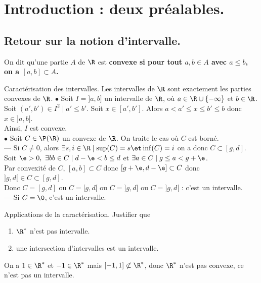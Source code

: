 \documentclass[11pt]{article}
\begin{document}


\thispagestyle{fancy}

\setcounter{section}{-1}

\section{Introduction : deux préalables.}

\subsection{Retour sur la notion d'intervalle.}

\begin{defi}{}{}
    On dit qu'une partie $A$ de $\R$ est \bf{convexe} si pour tout $a,b\in A$ avec $a\leq b$, on a $[a,b]\subset A$.
\end{defi}

\begin{prop}{Caractérisation des intervalles.}{}
    Les intervalles de $\R$ sont exactement les parties convexes de $\R$.
    \tcblower
    $\bullet$ Soit $I=]a,b]$ un intervalle de $\R$, où $a\in\R\cup\{-\infty\}$ et $b\in\R$.\\
    Soit $(a',b')\in I^2 \mid a' \leq b'$. Soit $x\in[a',b']$. Alors $a<a'\leq x \leq b' \leq b$ donc $x\in]a,b]$.\\
    Ainsi, $I$ est convexe.\\
    $\bullet$ Soit $C\in\P(\R)$ un convexe de $\R$. On traite le cas où $C$ est borné.\\
    --- Si $C\neq0$, alors $\exists s,i\in\R \mid \sup(C)=s \et \inf(C)=i$ on a donc $C\subset[g,d]$.\\
    Soit $\e>0, ~ \exists bb \in C \mid d-\e < b \leq d$ et $\exists a \in C \mid g \leq a < g + \e$.\\
    Par convexité de $C$, $[a,b]\subset C$ donc $[g+\e, d-\e]\subset C$ donc $]g,d[\in C\subset[g,d]$.\\
    Donc $C=[g,d]$ ou $C=[g,d[$ ou $C=]g,d]$ ou $C=]g,d[$ : c'est un intervalle.\\
    --- Si $C=\0$, c'est un intervalle.
\end{prop}

\begin{ex}{Applications de la caractérisation.}{}
    Justifier que
    \begin{enumerate}
        \item $\R^*$ n'est pas intervalle.
        \item une intersection d'intervalles est un intervalle.
    \end{enumerate}
    \tcblower
     On a $1\in\R^*$ et $-1\in\R^*$ mais $[-1,1]\not\subset\R^*$, donc $\R^*$ n'est pas convexe, ce n'est pas un intervalle.
\end{ex}
\end{document}
